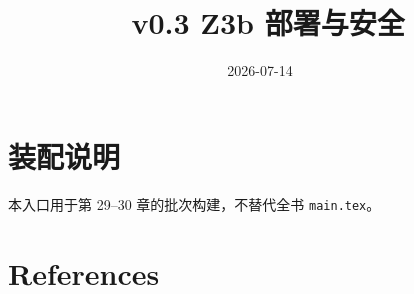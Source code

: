 \documentclass[UTF8,a4paper,12pt,openany]{ctexbook}
\title{\ReportTitle\ v0.3 Z3b 部署与安全}
\author{\ReportAuthor}
\date{2026-07-14}
\begin{document}
\frontmatter
\maketitle
\chapter*{装配说明}
本入口用于第 29--30 章的批次构建，不替代全书 \texttt{main.tex}。
\tableofcontents
\mainmatter
\setcounter{chapter}{28}


\backmatter
\chapter{References}
\printbibliography[heading=none]
\end{document}
